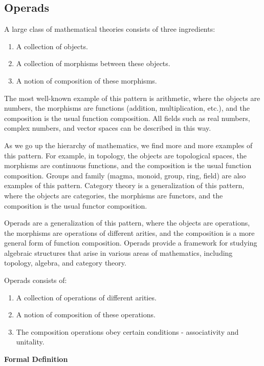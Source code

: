 
\subsection{Operads}

A large class of mathematical theories consists of three ingredients:
\begin{enumerate}
  \item A collection of objects.
  \item A collection of morphisms between these objects.
  \item A notion of composition of these morphisms.
\end{enumerate}

The most well-known example of this pattern is arithmetic, where the objects are numbers, the morphisms are functions (addition, multiplication, etc.), and the composition is the usual function composition. All fields such as real numbers, complex numbers, and vector spaces can be described in this way.

As we go up the hierarchy of mathematics, we find more and more examples of this pattern. For example, in topology, the objects are topological spaces, the morphisms are continuous functions, and the composition is the usual function composition. Groups and family (magma, monoid, group, ring, field) are also examples of this pattern. Category theory is a generalization of this pattern, where the objects are categories, the morphisms are functors, and the composition is the usual functor composition.

Operads are a generalization of this pattern, where the objects are operations, the morphisms are operations of different arities, and the composition is a more general form of function composition. Operads provide a framework for studying algebraic structures that arise in various areas of mathematics, including topology, algebra, and category theory.

Operads consists of:

\begin{enumerate}
  \item A collection of operations of different arities.
  \item A notion of composition of these operations.
  \item The composition operations obey certain conditions - associativity and unitality.
\end{enumerate}

\textbf{Formal Definition}
\\

